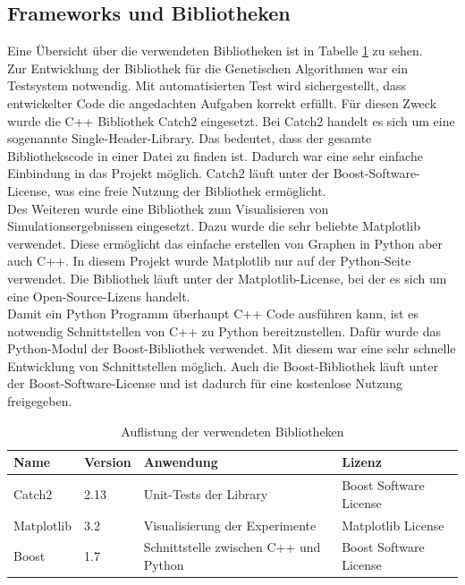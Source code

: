 \subsection{Frameworks und Bibliotheken}
Eine Übersicht über die verwendeten Bibliotheken ist in Tabelle \ref{tab:bibs} zu sehen.\\
Zur Entwicklung der Bibliothek für die Genetischen Algorithmen war ein Testsystem notwendig. Mit automatisierten Test wird sichergestellt, dass entwickelter Code die angedachten Aufgaben korrekt erfüllt.
Für diesen Zweck wurde die C++ Bibliothek Catch2 eingesetzt. Bei Catch2 handelt es sich um eine sogenannte Single-Header-Library. Das bedeutet, dass der gesamte Bibliothekscode in einer Datei zu finden ist.
Dadurch war eine sehr einfache Einbindung in das Projekt möglich. Catch2 läuft unter der Boost-Software-License, was eine freie Nutzung der Bibliothek ermöglicht.\\
Des Weiteren wurde eine Bibliothek zum Visualisieren von Simulationsergebnissen eingesetzt. Dazu wurde die sehr beliebte Matplotlib verwendet. Diese ermöglicht das einfache erstellen von Graphen in Python aber auch C++.
In diesem Projekt wurde Matplotlib nur auf der Python-Seite verwendet. Die Bibliothek läuft unter der Matplotlib-License, bei der es sich um eine Open-Source-Lizens handelt.\\
Damit ein Python Programm überhaupt C++ Code ausführen kann, ist es notwendig Schnittstellen von C++ zu Python bereitzustellen. Dafür wurde das Python-Modul der Boost-Bibliothek verwendet. Mit diesem war eine sehr schnelle Entwicklung von Schnittstellen möglich.
Auch die Boost-Bibliothek läuft unter der Boost-Software-License und ist dadurch für eine kostenlose Nutzung freigegeben.
\begin{table}[!htb]
\caption{Auflistung der verwendeten Bibliotheken}
\begin{tabular}{|l|l|l|l|}
 Name & Version & Anwendung & Lizenz \\ 
\hline
 Catch2 & 2.13 & Unit-Tests der Library & Boost Software License \cite{catch2} \\  
 Matplotlib & 3.2 & Visualisierung der Experimente & Matplotlib License \cite{matplotlib} \\
 Boost & 1.7 & Schnittstelle zwischen C++ und Python & Boost Software License  \cite{boost}   
\end{tabular}
\label{tab:bibs}
\end{table}


